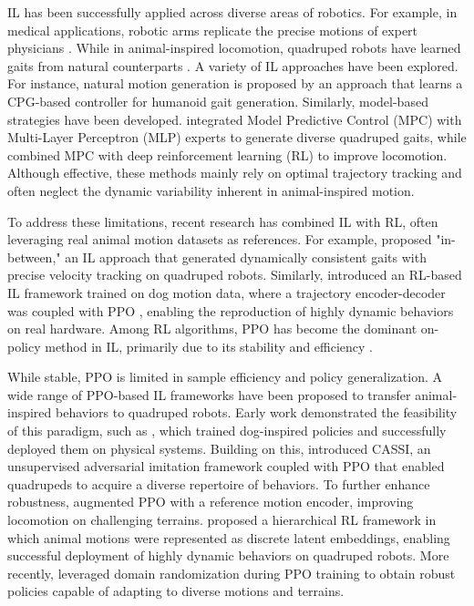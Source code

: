 \documentclass[letterpaper, 10pt, conference]{IEEEtran}
\begin{document}
IL has been successfully applied across diverse areas of robotics. For example, in medical applications, robotic arms replicate the precise motions of expert physicians \cite{Jian2025}. While in animal-inspired locomotion, quadruped robots have learned gaits from natural counterparts \cite{Zhang2025}. A variety of IL approaches have been explored. For instance, natural motion generation is proposed by \cite{Li2024} an approach that learns a CPG-based controller for humanoid gait generation. Similarly, model-based strategies have been developed. \cite{Reske2021} integrated Model Predictive Control (MPC) with Multi-Layer Perceptron (MLP) experts to generate diverse quadruped gaits, while \cite{Youm2023} combined MPC with deep reinforcement learning (RL) to improve locomotion. Although effective, these methods mainly rely on optimal trajectory tracking and often neglect the dynamic variability inherent in animal-inspired motion.

To address these limitations, recent research has combined IL with RL, often leveraging real animal motion datasets as references. For example, \cite{Chen2025} proposed "in-between," an IL approach that generated dynamically consistent gaits with precise velocity tracking on quadruped robots. Similarly, \cite{Zhang2024_2} introduced an RL-based IL framework trained on dog motion data, where a trajectory encoder-decoder was coupled with PPO \cite{Schulman2017}, enabling the reproduction of highly dynamic behaviors on real hardware. Among RL algorithms, PPO has become the dominant on-policy method in IL, primarily due to its stability and efficiency \cite{Luo2024}.

While stable, PPO is limited in sample efficiency and policy generalization. A wide range of PPO-based IL frameworks have been proposed to transfer animal-inspired behaviors to quadruped robots. Early work demonstrated the feasibility of this paradigm, such as \cite{Peng2020}, which trained dog-inspired policies and successfully deployed them on physical systems. Building on this, \cite{Li2022} introduced CASSI, an unsupervised adversarial imitation framework coupled with PPO that enabled quadrupeds to acquire a diverse repertoire of behaviors. To further enhance robustness, \cite{Li2023} augmented PPO with a reference motion encoder, improving locomotion on challenging terrains. \cite{Han2024} proposed a hierarchical RL framework in which animal motions were represented as discrete latent embeddings, enabling successful deployment of highly dynamic behaviors on quadruped robots. More recently, \cite{Xiao2025} leveraged domain randomization during PPO training to obtain robust policies capable of adapting to diverse motions and terrains.
\end{document}
